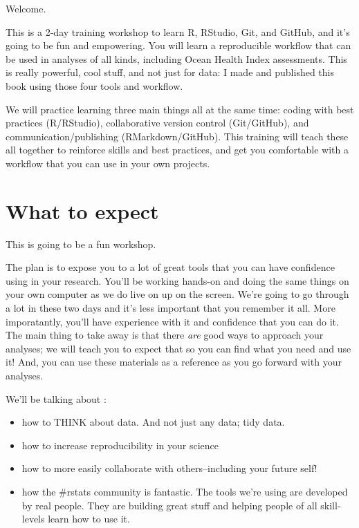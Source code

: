 \documentclass[]{book}
\providecommand{\tightlist}{%
  \setlength{\itemsep}{0pt}\setlength{\parskip}{0pt}}
\theoremstyle{definition}
\theoremstyle{definition}
\theoremstyle{definition}
\theoremstyle{remark}
\begin{document}
Welcome.

This is a 2-day training workshop to learn R, RStudio, Git, and GitHub,
and it's going to be fun and empowering. You will learn a reproducible
workflow that can be used in analyses of all kinds, including Ocean
Health Index assessments. This is really powerful, cool stuff, and not
just for data: I made and published this book using those four tools and
workflow.

We will practice learning three main things all at the same time: coding
with best practices (R/RStudio), collaborative version control
(Git/GitHub), and communication/publishing (RMarkdown/GitHub). This
training will teach these all together to reinforce skills and best
practices, and get you comfortable with a workflow that you can use in
your own projects.

\section{What to expect}\label{what-to-expect}

This is going to be a fun workshop.

The plan is to expose you to a lot of great tools that you can have
confidence using in your research. You'll be working hands-on and doing
the same things on your own computer as we do live on up on the screen.
We're going to go through a lot in these two days and it's less
important that you remember it all. More imporatantly, you'll have
experience with it and confidence that you can do it. The main thing to
take away is that there \emph{are} good ways to approach your analyses;
we will teach you to expect that so you can find what you need and use
it! And, you can use these materials as a reference as you go forward
with your analyses.

We'll be talking about :

\begin{itemize}
\tightlist
\item
  how to THINK about data. And not just any data; tidy data.
\item
  how to increase reproducibility in your science
\item
  how to more easily collaborate with others--including your future
  self!
\item
  how the \#rstats community is fantastic. The tools we're using are
  developed by real people. They are building great stuff and helping
  people of all skill-levels learn how to use it.
\end{itemize}
\end{document}
